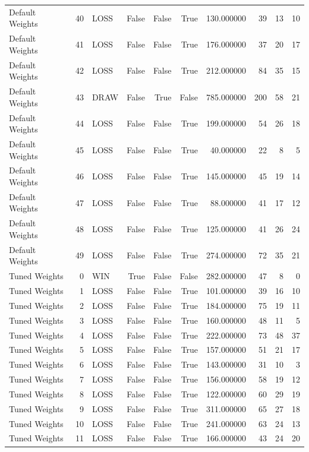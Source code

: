 \begin{table}[htbp]
\begin{tabular}{lrlrrrrrrr}
Default Weights & 40 & LOSS & False & False & True & 130.000000 & 39 & 13 & 10 \\
Default Weights & 41 & LOSS & False & False & True & 176.000000 & 37 & 20 & 17 \\
Default Weights & 42 & LOSS & False & False & True & 212.000000 & 84 & 35 & 15 \\
Default Weights & 43 & DRAW & False & True & False & 785.000000 & 200 & 58 & 21 \\
Default Weights & 44 & LOSS & False & False & True & 199.000000 & 54 & 26 & 18 \\
Default Weights & 45 & LOSS & False & False & True & 40.000000 & 22 & 8 & 5 \\
Default Weights & 46 & LOSS & False & False & True & 145.000000 & 45 & 19 & 14 \\
Default Weights & 47 & LOSS & False & False & True & 88.000000 & 41 & 17 & 12 \\
Default Weights & 48 & LOSS & False & False & True & 125.000000 & 41 & 26 & 24 \\
Default Weights & 49 & LOSS & False & False & True & 274.000000 & 72 & 35 & 21 \\
Tuned Weights & 0 & WIN & True & False & False & 282.000000 & 47 & 8 & 0 \\
Tuned Weights & 1 & LOSS & False & False & True & 101.000000 & 39 & 16 & 10 \\
Tuned Weights & 2 & LOSS & False & False & True & 184.000000 & 75 & 19 & 11 \\
Tuned Weights & 3 & LOSS & False & False & True & 160.000000 & 48 & 11 & 5 \\
Tuned Weights & 4 & LOSS & False & False & True & 222.000000 & 73 & 48 & 37 \\
Tuned Weights & 5 & LOSS & False & False & True & 157.000000 & 51 & 21 & 17 \\
Tuned Weights & 6 & LOSS & False & False & True & 143.000000 & 31 & 10 & 3 \\
Tuned Weights & 7 & LOSS & False & False & True & 156.000000 & 58 & 19 & 12 \\
Tuned Weights & 8 & LOSS & False & False & True & 122.000000 & 60 & 29 & 19 \\
Tuned Weights & 9 & LOSS & False & False & True & 311.000000 & 65 & 27 & 18 \\
Tuned Weights & 10 & LOSS & False & False & True & 241.000000 & 63 & 24 & 13 \\
Tuned Weights & 11 & LOSS & False & False & True & 166.000000 & 43 & 24 & 20 \\

\end{tabular}
\end{table}
